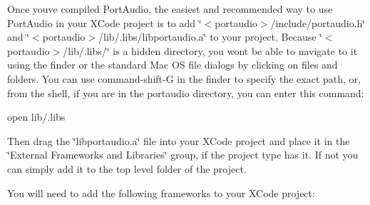Once you\textquotesingle{}ve compiled Port\+Audio, the easiest and recommended way to use Port\+Audio in your X\+Code project is to add \char`\"{}$<$portaudio$>$/include/portaudio.\+h\char`\"{} and \char`\"{}$<$portaudio$>$/lib/.\+libs/libportaudio.\+a\char`\"{} to your project. Because \char`\"{}$<$portaudio$>$/lib/.\+libs/\char`\"{} is a hidden directory, you won\textquotesingle{}t be able to navigate to it using the finder or the standard Mac OS file dialogs by clicking on files and folders. You can use command-\/shift-\/G in the finder to specify the exact path, or, from the shell, if you are in the portaudio directory, you can enter this command\+:


\begin{DoxyCode}
open lib/.libs
\end{DoxyCode}


Then drag the \char`\"{}libportaudio.\+a\char`\"{} file into your X\+Code project and place it in the \char`\"{}\+External Frameworks and Libraries\char`\"{} group, if the project type has it. If not you can simply add it to the top level folder of the project.

You will need to add the following frameworks to your X\+Code project\+:


